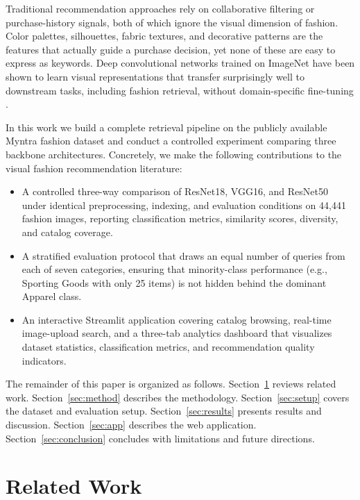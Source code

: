 \documentclass[conference]{IEEEtran}
\begin{document}
Traditional recommendation approaches rely on collaborative filtering
or purchase-history signals, both of which ignore the visual dimension
of fashion. Color palettes, silhouettes, fabric textures, and decorative
patterns are the features that actually guide a purchase decision, yet
none of these are easy to express as keywords. Deep convolutional
networks trained on ImageNet have been shown to learn visual
representations that transfer surprisingly well to downstream tasks,
including fashion retrieval, without domain-specific fine-tuning
\cite{yosinski2014transferable}.

In this work we build a complete retrieval pipeline on the publicly
available Myntra fashion dataset and conduct a controlled experiment
comparing three backbone architectures. Concretely, we make the
following contributions to the visual fashion recommendation
literature:

\begin{itemize}
  \item A controlled three-way comparison of ResNet18, VGG16, and
        ResNet50 under identical preprocessing, indexing, and evaluation
        conditions on 44,441 fashion images, reporting classification
        metrics, similarity scores, diversity, and catalog coverage.
  \item A stratified evaluation protocol that draws an equal number of
        queries from each of seven categories, ensuring that
        minority-class performance (e.g., Sporting Goods with only 25
        items) is not hidden behind the dominant Apparel class.
  \item An interactive Streamlit application covering catalog browsing,
        real-time image-upload search, and a three-tab analytics
        dashboard that visualizes dataset statistics, classification
        metrics, and recommendation quality indicators.
\end{itemize}

The remainder of this paper is organized as follows.
Section~\ref{sec:related} reviews related work. Section~\ref{sec:method}
describes the methodology. Section~\ref{sec:setup} covers the dataset
and evaluation setup. Section~\ref{sec:results} presents results and
discussion. Section~\ref{sec:app} describes the web application.
Section~\ref{sec:conclusion} concludes with limitations and future
directions.


\section{Related Work}
\label{sec:related}
\end{document}
